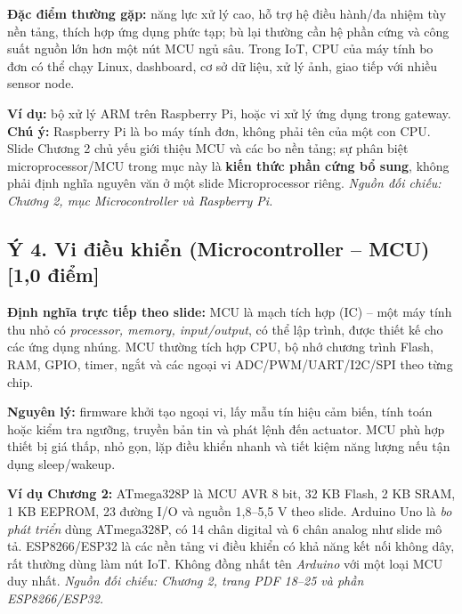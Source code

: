 \documentclass[12pt,a4paper]{article}
\newcommand{\muc}[1]{\subsection*{#1\hfill{\color{teal}\normalsize [1,0 điểm]}}}
\newcommand{\nguon}[1]{{\small\itshape\color{navy}Nguồn đối chiếu: #1.}}
\begin{document}
\textbf{Đặc điểm thường gặp:} năng lực xử lý cao, hỗ trợ hệ điều hành/đa nhiệm tùy nền tảng, thích hợp ứng dụng phức tạp; bù lại thường cần hệ phần cứng và công suất nguồn lớn hơn một nút MCU ngủ sâu. Trong IoT, CPU của máy tính bo đơn có thể chạy Linux, dashboard, cơ sở dữ liệu, xử lý ảnh, giao tiếp với nhiều sensor node.

\textbf{Ví dụ:} bộ xử lý ARM trên Raspberry Pi, hoặc vi xử lý ứng dụng trong gateway. \textbf{Chú ý:} Raspberry Pi là bo máy tính đơn, không phải tên của một con CPU. Slide Chương 2 chủ yếu giới thiệu MCU và các bo nền tảng; sự phân biệt microprocessor/MCU trong mục này là \textbf{kiến thức phần cứng bổ sung}, không phải định nghĩa nguyên văn ở một slide Microprocessor riêng. \nguon{Chương 2, mục Microcontroller và Raspberry Pi}

\muc{Ý 4. Vi điều khiển (Microcontroller -- MCU)}
\textbf{Định nghĩa trực tiếp theo slide:} MCU là mạch tích hợp (IC) -- một máy tính thu nhỏ có \emph{processor, memory, input/output}, có thể lập trình, được thiết kế cho các ứng dụng nhúng. MCU thường tích hợp CPU, bộ nhớ chương trình Flash, RAM, GPIO, timer, ngắt và các ngoại vi ADC/PWM/UART/I2C/SPI theo từng chip.

\textbf{Nguyên lý:} firmware khởi tạo ngoại vi, lấy mẫu tín hiệu cảm biến, tính toán hoặc kiểm tra ngưỡng, truyền bản tin và phát lệnh đến actuator. MCU phù hợp thiết bị giá thấp, nhỏ gọn, lặp điều khiển nhanh và tiết kiệm năng lượng nếu tận dụng sleep/wakeup.

\textbf{Ví dụ Chương 2:} ATmega328P là MCU AVR 8 bit, 32 KB Flash, 2 KB SRAM, 1 KB EEPROM, 23 đường I/O và nguồn 1,8--5,5 V theo slide. Arduino Uno là \emph{bo phát triển} dùng ATmega328P, có 14 chân digital và 6 chân analog như slide mô tả. ESP8266/ESP32 là các nền tảng vi điều khiển có khả năng kết nối không dây, rất thường dùng làm nút IoT. Không đồng nhất tên \emph{Arduino} với một loại MCU duy nhất. \nguon{Chương 2, trang PDF 18--25 và phần ESP8266/ESP32}
\end{document}
